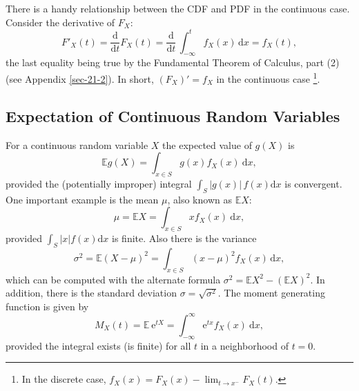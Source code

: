 \documentclass[captions=tableheading]{scrbook}
\begin{document}
There is a handy relationship between the CDF and PDF in the continuous case. Consider the derivative of \(F_{X}\):
\begin{equation}
F'_{X}(t)=\frac{\mathrm{d}}{\mathrm{d} t}F_{X}(t)=\frac{\mathrm{d}}{\mathrm{d} t}\,\int_{-\infty}^{t}f_{X}(x)\,\mathrm{d} x=f_{X}(t),
\end{equation}
the last equality being true by the Fundamental Theorem of Calculus, part (2) (see Appendix \ref{sec-21-2}). In short, \((F_{X})'=f_{X}\) in the continuous case
\footnote{In the discrete case, \(f_{X}(x)=F_{X}(x)-\lim_{t\to x^{-}}F_{X}(t)\).}. 
\subsection{Expectation of Continuous Random Variables}
\label{sec-6-1-2}
\label{sub-Expectation-of-Continuous}


For a continuous random variable \(X\) the expected value of \(g(X)\) is
\begin{equation}
\mathbb{E} g(X)=\int_{x\in S}g(x)f_{X}(x)\:\mathrm{d} x,
\end{equation}
provided the (potentially improper) integral \(\int_{S}|g(x)|\, f(x)\mathrm{d} x\) is convergent. One important example is the mean \(\mu\), also known as \(\mathbb{E} X\):
\begin{equation}
\mu=\mathbb{E} X=\int_{x\in S}xf_{X}(x)\:\mathrm{d} x,
\end{equation}
provided \(\int_{S}|x|f(x)\mathrm{d} x\) is finite. Also there is the variance
\begin{equation}
\sigma^{2}=\mathbb{E}(X-\mu)^{2}=\int_{x\in S}(x-\mu)^{2}f_{X}(x)\,\mathrm{d} x,
\end{equation}
which can be computed with the alternate formula \(\sigma^{2}=\mathbb{E} X^{2}-(\mathbb{E} X)^{2}\). In addition, there is the standard deviation \(\sigma=\sqrt{\sigma^{2}}\). The moment generating function is given by
\begin{equation}
M_{X}(t)=\mathbb{E}\:\mathrm{e}^{tX}=\int_{-\infty}^{\infty}\mathrm{e}^{tx}f_{X}(x)\:\mathrm{d} x,
\end{equation}
provided the integral exists (is finite) for all \(t\) in a neighborhood of \(t=0\).
\end{document}
